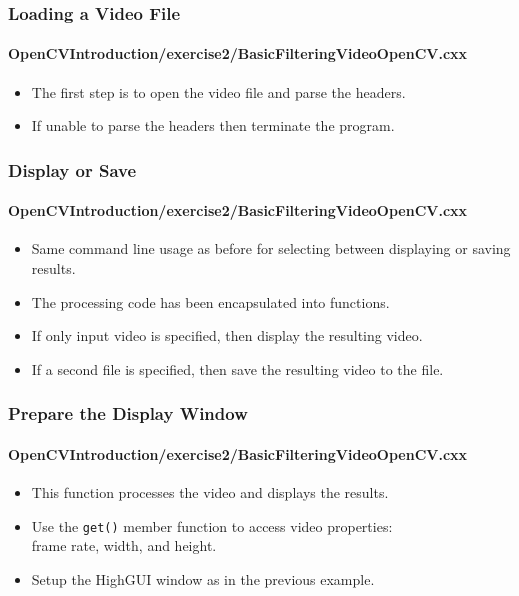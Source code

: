 \begin{frame}
\frametitle{Loading a Video File}
\framesubtitle{OpenCVIntroduction/exercise2/BasicFilteringVideoOpenCV.cxx}
\begin{center}
\begin{itemize}
\item The first step is to open the video file and parse the headers.
\item If unable to parse the headers then terminate the program.
\end{itemize}
\end{center}
\end{frame}


\begin{frame}
\frametitle{Display or Save}
\framesubtitle{OpenCVIntroduction/exercise2/BasicFilteringVideoOpenCV.cxx}
\begin{center}
\begin{itemize}
\item Same command line usage as before for selecting between displaying
      or saving results.
\item The processing code has been encapsulated into functions.
\item If only input video is specified, then display the resulting video.
\item If a second file is specified, then save the resulting video to the file.
\end{itemize}
\end{center}
\end{frame}


\begin{frame}
\frametitle{Prepare the Display Window}
\framesubtitle{OpenCVIntroduction/exercise2/BasicFilteringVideoOpenCV.cxx}
\begin{center}
\begin{itemize}
\item This function processes the video and displays the results.
\item Use the {\tt\small get()} member function to access video properties: \\
      frame rate, width, and height.
\item Setup the HighGUI window as in the previous example.
\end{itemize}
\end{center}
\end{frame}


